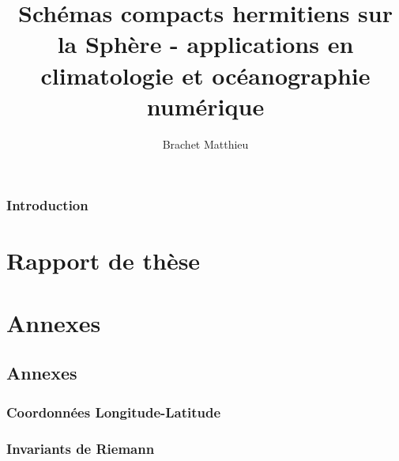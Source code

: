 \documentclass[10pt,a4paper]{book}
\author{Brachet Matthieu}
\title{Schémas compacts hermitiens sur la Sphère - applications en climatologie et océanographie numérique}
\begin{document}
\maketitle
\newpage
\tableofcontents
\listoffigures
\listoftables

\newpage

\section*{Introduction}
%

\part{Rapport de thèse}









\part{Annexes}

\chapter{Annexes}
\section{Coordonnées Longitude-Latitude}

\section{Invariants de Riemann}



%



\end{document}

